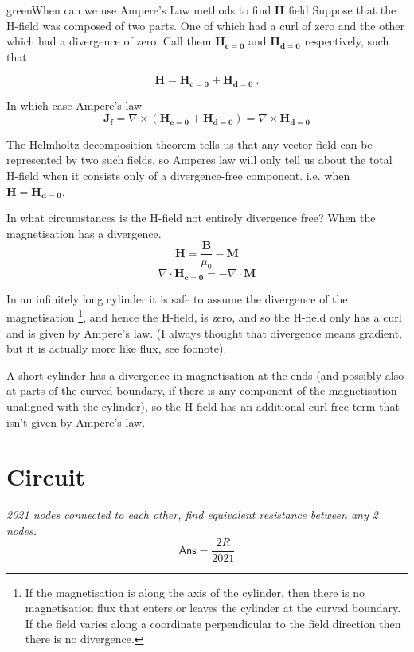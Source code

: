 \begin{mybox}{green}{When can we use Ampere's Law methods to find $\mathbf{H}$ field}
    Suppose that the H-field was composed of two parts. One of which had a curl of zero and the other which had a divergence of zero. Call them $\mathbf{H_{c=0}}$ and $\mathbf{H_{d=0}}$ respectively, such that

    $$\mathbf{H} = \mathbf{H_{c=0}} + \mathbf{H_{d=0}}\ .$$

    In which case Ampere's law
    $$\mathbf{J_f}=\nabla \times (\mathbf{H_{c=0}} + \mathbf{H_{d=0}})=\nabla \times \mathbf{H_{d=0}}$$

    The Helmholtz decomposition theorem tells us that any vector field can be represented by two such fields, so Amperes law will only tell us about the total H-field when it consists only of a divergence-free component. i.e. when $\mathbf{H}=\mathbf{H_{d=0}}$.

    In what circumstances is the H-field not entirely divergence free? When the magnetisation has a divergence.
    $$\mathbf{H}=\frac{\mathbf{B}}{\mu_0}-\mathbf{M}$$
    $$\nabla \cdot \mathbf{H_{c=0}} = - \nabla \cdot \mathbf{M}$$
\end{mybox}
In an infinitely long cylinder it is safe to assume the divergence of the magnetisation \footnote{ If the magnetisation is along the axis of the cylinder, then there is no magnetisation flux that enters or leaves the cylinder at the curved boundary. If the field varies along a coordinate perpendicular to the field direction then there is no divergence.}, and hence the H-field, is zero, and so the H-field only has a curl and is given by Ampere's law. (I always thought that divergence means gradient, but it is actually more like flux, see foonote).

A short cylinder has a divergence in magnetisation at the ends (and possibly also at parts of the curved boundary, if there is any component of the magnetisation unaligned with the cylinder), so the H-field has an additional curl-free term that isn't given by Ampere's law.

\section{Circuit}
\textit{2021 nodes connected to each other, find equivalent resistance between any 2 nodes.}
\begin{equation}
    \boxed{\textsf{Ans}=\frac{2R}{2021}}\nonumber
\end{equation}

